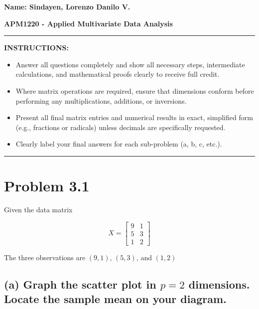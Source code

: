 \documentclass[12pt]{article}
\begin{document}
\noindent
\textbf{Name: Sindayen, Lorenzo Danilo V.}

\noindent
\textbf{APM1220 - Applied Multivariate Data Analysis}

\vspace{0.4cm}
\hrule
\vspace{0.5cm}

\textbf{INSTRUCTIONS:}

\begin{itemize}
    \item Answer all questions completely and show all necessary steps, intermediate calculations, and mathematical proofs clearly to receive full credit.
    \item Where matrix operations are required, ensure that dimensions conform before performing any multiplications, additions, or inversions.
    \item Present all final matrix entries and numerical results in exact, simplified form (e.g., fractions or radicals) unless decimals are specifically requested.
    \item Clearly label your final answers for each sub-problem (a, b, c, etc.).
\end{itemize}

\vspace{0.3cm}
\hrule
\vspace{0.7cm}

\section*{Problem 3.1}

\vspace{0.2cm}

Given the data matrix

\vspace{0.2cm}

\[
X=\begin{bmatrix}
9&1\\
5&3\\
1&2
\end{bmatrix}
\]

\vspace{0.2cm}

The three observations are $(9,1)$, $(5,3)$, and $(1,2)$

\vspace{0.2cm}

\subsection*{(a) Graph the scatter plot in $p=2$ dimensions. Locate the sample mean on your diagram.}
\end{document}
